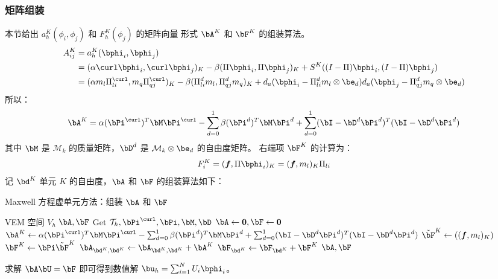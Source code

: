 \subsubsection{矩阵组装}
本节给出 $a_h^K(\phi_i, \phi_j)$ 和 $F_h^K(\phi_j)$ 的矩阵向量
形式 $\bA^K$ 和 $\bF^K$ 的组装算法。
$$
\begin{aligned}
    A_{ij}^K & = a_h^K(\bphi_i, \bphi_j)\\
    & = (\alpha\curl \bphi_i, \curl \bphi_j)_K -
    \beta(\Pi\bphi_i, \Pi\bphi_j)_K + S^K((I - \Pi)\bphi_i,
    (I - \Pi)\bphi_j)\\
    & = (\alpha m_l \Pi^{\curl}_{li}, m_q \Pi^{\curl}_{qj})_K -
    \beta(\Pi_{li}^dm_l, \Pi_{qj}^dm_q)_K +
    d_a(\bphi_i-\Pi_{li}^dm_l\otimes\be_d)
    d_a(\bphi_j-\Pi_{qj}^dm_q\otimes\be_d)\\
\end{aligned}
$$
所以：
$$
\bA^K = \alpha(\bPi^{\curl})^T\bM\bPi^{\curl} - 
\sum_{d=0}^1\beta(\bPi^d)^T\bM\bPi^d +
\sum_{d=0}^1(\bI - \bD^d\bPi^d)^T(\bI - \bD^d\bPi^d)
$$
其中 $\bM$ 是 $\mathcal{M}_k$ 的质量矩阵，$\bD^d$ 是 $\mathcal{M}_k\otimes \be_d$
的自由度矩阵。
右端项 $\bF^K$ 的计算为：
$$
F_{i}^K = (\boldsymbol{f}, \Pi \bphi_i)_K = (\boldsymbol{f}, m_l)_K \Pi_{li}
$$
记 $\bd^K$ 单元 $K$ 的自由度，$\bA$ 和 $\bF$ 的组装算法如下：
\begin{algorithm}[H]
    \caption{Maxwell 方程虚单元方法：组装 $\bA$ 和 $\bF$}\label{alg:assembleAF}
\begin{algorithmic}[1]
    \Require VEM 空间 $V_h$
    \Ensure $\bA, \bF$
    \State Get $\mathcal{T}_h, \bPi^{\curl}, \bPi, \bM, \bD$ 
    \State $\bA \gets \boldsymbol{0}, \bF \gets \boldsymbol{0}$
        \State $\bA^K \gets \alpha(\bPi^{\curl})^T\bM\bPi^{\curl} - 
        \sum_{d=0}^1\beta(\bPi^d)^T\bM\bPi^d +
        \sum_{d=0}^1(\bI - \bD^d\bPi^d)^T(\bI - \bD^d\bPi^d)$
        \State $\tilde{\bF}^K \gets ((\boldsymbol{f}, m_l)_K)$
        \State $\bF^K \gets \bPi\tilde{\bF}^K$ 
        \State $\bA_{\bd^K, \bd^K} \gets \bA_{\bd^K, \bd^K} + \bA^K$
        \State $\bF_{\bd^K} \gets \bF_{\bd^K} + \bF^K$
    \EndFor
    \State \Return $\bA, \bF$
\end{algorithmic}
\end{algorithm}
求解 $\bA \bU = \bF$ 即可得到数值解 $\bu_h = \sum_{i=1}^{N} U_i \bphi_i$。

